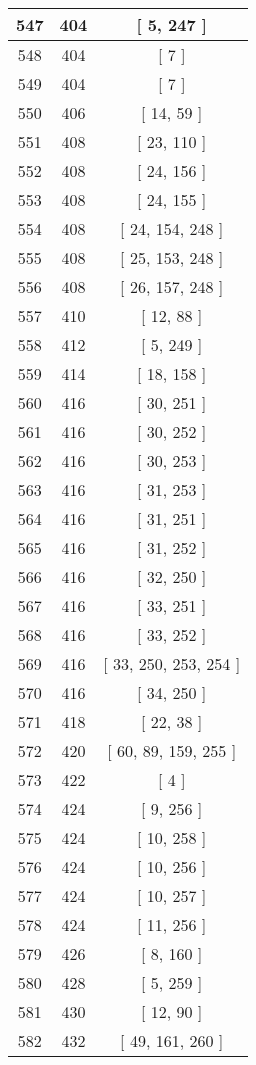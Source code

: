 \begin{center}
\begin{longtable}[H]{|| c c c ||}
547 & 404 & [ 5, 247 ]
\\\hline
548 & 404 & [ 7 ]
\\\hline
549 & 404 & [ 7 ]
\\\hline
550 & 406 & [ 14, 59 ]
\\\hline
551 & 408 & [ 23, 110 ]
\\\hline
552 & 408 & [ 24, 156 ]
\\\hline
553 & 408 & [ 24, 155 ]
\\\hline
554 & 408 & [ 24, 154, 248 ]
\\\hline
555 & 408 & [ 25, 153, 248 ]
\\\hline
556 & 408 & [ 26, 157, 248 ]
\\\hline
557 & 410 & [ 12, 88 ]
\\\hline
558 & 412 & [ 5, 249 ]
\\\hline
559 & 414 & [ 18, 158 ]
\\\hline
560 & 416 & [ 30, 251 ]
\\\hline
561 & 416 & [ 30, 252 ]
\\\hline
562 & 416 & [ 30, 253 ]
\\\hline
563 & 416 & [ 31, 253 ]
\\\hline
564 & 416 & [ 31, 251 ]
\\\hline
565 & 416 & [ 31, 252 ]
\\\hline
566 & 416 & [ 32, 250 ]
\\\hline
567 & 416 & [ 33, 251 ]
\\\hline
568 & 416 & [ 33, 252 ]
\\\hline
569 & 416 & [ 33, 250, 253, 254 ]
\\\hline
570 & 416 & [ 34, 250 ]
\\\hline
571 & 418 & [ 22, 38 ]
\\\hline
572 & 420 & [ 60, 89, 159, 255 ]
\\\hline
573 & 422 & [ 4 ]
\\\hline
574 & 424 & [ 9, 256 ]
\\\hline
575 & 424 & [ 10, 258 ]
\\\hline
576 & 424 & [ 10, 256 ]
\\\hline
577 & 424 & [ 10, 257 ]
\\\hline
578 & 424 & [ 11, 256 ]
\\\hline
579 & 426 & [ 8, 160 ]
\\\hline
580 & 428 & [ 5, 259 ]
\\\hline
581 & 430 & [ 12, 90 ]
\\\hline
582 & 432 & [ 49, 161, 260 ]
\\\hline

\end{longtable}
\end{center}
